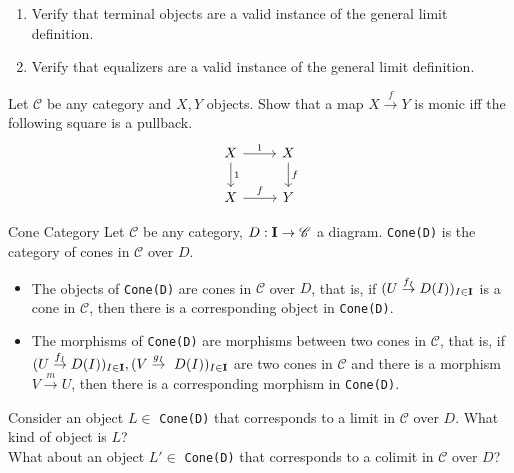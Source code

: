 \def\pathToRoot{../../}

\usepackage{upgreek}



\author{Leonhard Staut}

\begin{exercise}
  \begin{enumerate}
  \item Verify that terminal objects are a valid instance of the general limit definition.
  \item Verify that equalizers are a valid instance of the general limit definition.
  \end{enumerate}
\end{exercise}

\begin{exercise}
  Let $\mathscr{C}$ be any category and $X, Y$ objects.
  Show that a map $X \overset{f}{\to} Y$ is monic iff the following square is a pullback.
  \[
    \begin{tikzcd}
      X \arrow{r}{1}  \arrow{d}{1}  & X \arrow{d}{f}    \\
      X \arrow{r}{f}                & Y                  
    \end{tikzcd}
  \]
\end{exercise}

\begin{definition}
  {Cone Category}
  Let $\mathscr{C}$ be any category, $D : \bf{I} \to \mathscr{C}$ a diagram.
  \texttt{Cone(D)} is the category of cones in $\mathscr{C}$ over $D$.
  \begin{itemize}
  \item The objects of \texttt{Cone(D)} are cones in $\mathscr{C}$ over $D$, that is, if
    $(U \overset{f_I}{\to} D(I))_{I \in \bf{I}}$ is a cone in $\mathscr{C}$, then there is a corresponding object
    in \texttt{Cone(D)}.
  \item The morphisms of \texttt{Cone(D)} are morphisms between two cones in $\mathscr{C}$, that is,
    if $(U \overset{f_I}{\to} D(I))_{I \in \bf{I}}, (V \overset{g_I}{\to}~ D(I))_{I \in \bf{I}}$
    are two cones in $\mathscr{C}$ and there is a morphism $V \overset{m}{\to} U$, then there
    is a corresponding morphism in \texttt{Cone(D)}.
  \end{itemize}
\end{definition}

\begin{exercise}
  Consider an object $L \in$ \texttt{Cone(D)} that corresponds to a limit in $\mathscr{C}$ over $D$.
  What kind of object is $L$?\\
  What about an object $L' \in$ \texttt{Cone(D)} that corresponds to a colimit in $\mathscr{C}$ over $D$?
\end{exercise}

